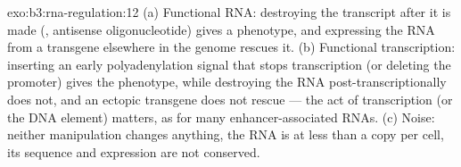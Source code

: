 \begin{solution}{exo:b3:rna-regulation:12}
(a) Functional RNA: destroying the transcript after it is made (,
antisense oligonucleotide) gives a phenotype, and expressing the RNA
from a transgene elsewhere in the genome rescues it. (b) Functional
transcription: inserting an early polyadenylation signal that stops
transcription (or deleting the promoter) gives the phenotype, while
destroying the RNA post-transcriptionally does not, and an ectopic
transgene does not rescue --- the act of transcription (or the DNA
element) matters, as for many enhancer-associated RNAs. (c) Noise:
neither manipulation changes anything, the RNA is at less than a copy
per cell, its sequence and expression are not conserved.
\end{solution}

